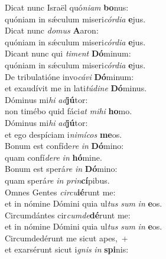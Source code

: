\evenverse Dicat nunc Israël quó\textit{ni}\textit{am} \textbf{bo}nus:~\*\\
\evenverse quóniam in sǽculum miseri\textit{cór}\textit{di}\textit{a} \textbf{e}jus.\\
\oddverse Dicat nunc \textit{do}\textit{mus} \textbf{A}aron:~\*\\
\oddverse quóniam in sǽculum miseri\textit{cór}\textit{di}\textit{a} \textbf{e}jus.\\
\evenverse Dicant nunc qui \textit{ti}\textit{ment} \textbf{Dó}minum:~\*\\
\evenverse quóniam in sǽculum miseri\textit{cór}\textit{di}\textit{a} \textbf{e}jus.\\
\oddverse De tribulatióne invo\textit{cá}\textit{vi} \textbf{Dó}minum:~\*\\
\oddverse et exaudívit me in lati\textit{tú}\textit{di}\textit{ne} \textbf{Dó}minus.\\
\evenverse Dóminus mi\textit{hi} \textit{ad}\textbf{jú}tor:~\*\\
\evenverse non timébo quid fáci\textit{at} \textit{mi}\textit{hi} \textbf{ho}mo.\\
\oddverse Dóminus mi\textit{hi} \textit{ad}\textbf{jú}tor:~\*\\
\oddverse et ego despíciam i\textit{ni}\textit{mí}\textit{cos} \textbf{me}os.\\
\evenverse Bonum est confíde\textit{re} \textit{in} \textbf{Dó}mino:~\*\\
\evenverse quam confí\textit{de}\textit{re} \textit{in} \textbf{hó}mine.\\
\oddverse Bonum est sperá\textit{re} \textit{in} \textbf{Dó}mino:~\*\\
\oddverse quam sperá\textit{re} \textit{in} \textit{prin}\textbf{cí}pibus.\\
\evenverse Omnes Gentes \textit{cir}\textit{cu}\textbf{ié}runt me:~\*\\
\evenverse et in nómine Dómini quia ul\textit{tus} \textit{sum} \textit{in} \textbf{e}os.\\
\oddverse Circumdántes cir\textit{cum}\textit{de}\textbf{dé}runt me:~\*\\
\oddverse et in nómine Dómini quia ul\textit{tus} \textit{sum} \textit{in} \textbf{e}os.\\
\evenverse Circumdedérunt me sicut apes,~+\\
\evenverse  et exarsérunt sicut i\textit{gnis} \textit{in} \textbf{spi}nis:~\*\\
